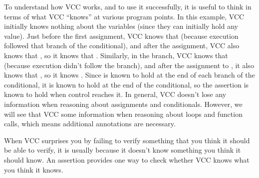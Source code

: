 To understand how VCC works, and to use it successfully, it is useful to
think in terms of what VCC ``knows'' at various program points. In
this example, VCC initially knows nothing about the variables (since they
can initially hold any value). 
Just before the first assignment, VCC knows that 
 (because execution followed that branch of the conditional), and
after the assignment, VCC also knows that , 
so it knows that . Similarly, in the  branch,
VCC knows that  (because execution didn't follow the
 branch), and after the assignment to , it also knows
that , so it knows . Since 
 is known to hold at the end of each branch of the
conditional, it is known to hold at the end of the conditional, so the
assertion is known to hold when control reaches it. In general,
VCC doesn't lose any information when reasoning about assignments and
conditionals. However, we will see that VCC
 some information when reasoning about loops and function calls,
which means additional annotations are necessary.

When VCC surprises you by failing to verify something that you think
it should be able to verify, it is usually because it doesn't know
something you think it should know. An assertion provides one way to
check whether VCC knows what you think it knows.

%

